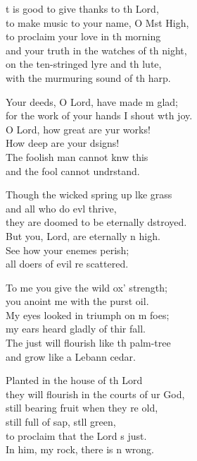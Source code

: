 \settowidth{\versewidth}{for the work of your hands I shout with joy.}
\begin{psalmverse}%
  \begin{patverse}
t is good to give thanks to th Lord,\Med\\
    to make music to your name, O Mst High,\\
to proclaim your love in th morning\Med\\
    and your truth in the watches of th night,\\
on the ten-stringed lyre and th lute,\Med\\
    with the murmuring sound of th harp.

Your deeds, O Lord, have made m glad;\Med\\
    for the work of your hands I shout w\pointup{\i}th joy.\\
O Lord, how great are yur works!\Med\\
    How deep are your dsigns!\\
The foolish man cannot knw this\Med\\
    and the fool cannot undrstand.

Though the wicked spring up l\pointup{\i}ke grass\Med\\
    and all who do ev\pointup{\i}l thrive,\\
they are doomed to be eternally dstroyed.\Med\\
    But you, Lord, are eternally n high.\\
See how your enem\pointup{\i}es perish;\Med\\
    all doers of evil re scattered.

To me you give the wild ox’ strength;\Med\\
    you anoint me with the purst oil.\\
My eyes looked in triumph on m foes;\Med\\
    my ears heard gladly of thir fall.\\
The just will flourish like th palm-tree\Med\\
    and grow like a Lebann cedar.

Planted in the house of th Lord\Med\\
    they will flourish in the courts of ur God,\\
still bearing fruit when they re old,\Med\\
    still full of sap, st\pointup{\i}ll green,\\
to proclaim that the Lord \pointup{\i}s just.\Med\\
    In him, my rock, there is n wrong.


\end{patverse}
\end{psalmverse}
